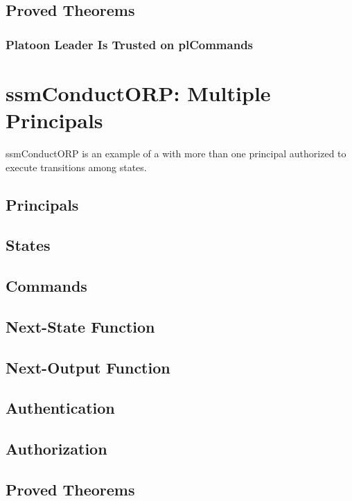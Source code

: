 \documentclass[../../main/main.tex]{subfiles}
\begin{document}
\subsection{Proved Theorems}
\subsubsection{Platoon Leader Is Trusted on plCommands}


     
\section{ssmConductORP: Multiple Principals}
ssmConductORP is an example of a  with more than one principal authorized to execute transitions among states.

\subsection{Principals}
\subsection{States}
\subsection{Commands}
\subsection{Next-State Function}
\subsection{Next-Output Function}
\subsection{Authentication}
\HOLssmPlanPBTheoremsinputOKXXdef


\subsection{Authorization}
\subsection{Proved Theorems}
\end{document}
